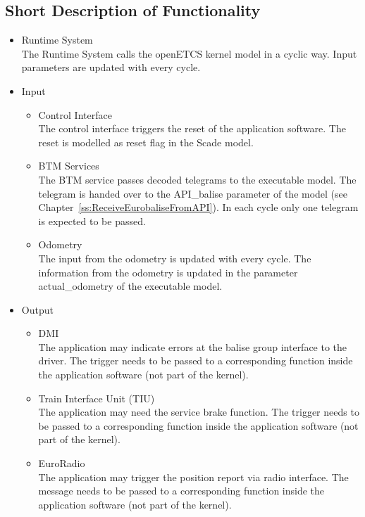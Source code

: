 \documentclass{template/openetcs_report}
\begin{document}
\subsection{Short Description of Functionality}

\begin{itemize}
\item Runtime System\\
The Runtime System calls the openETCS kernel model in a cyclic way. Input parameters are updated with every cycle.
\item Input
\begin{itemize}
\item Control Interface\\
The control interface triggers the reset of the application software. The reset is modelled as reset flag in the Scade model.

\item BTM Services\\
The BTM service passes decoded telegrams to the executable model. The telegram is handed over to the API\_balise parameter of the model (see Chapter~\ref{ss:ReceiveEurobaliseFromAPI}). In each cycle only one telegram is expected to be passed.

\item Odometry\\
The input from the odometry is updated with every cycle. The information from the odometry is updated in the parameter actual\_odometry of the executable model.
\end{itemize}

\item Output
\begin{itemize}
\item DMI\\
The application may indicate errors at the balise group interface to the driver. The trigger needs to be passed to a corresponding function inside the application software (not part of the kernel).
\item Train Interface Unit (TIU)\\
The application may need the service brake function. The trigger needs to be passed to a corresponding function inside the application software (not part of the kernel).
\item EuroRadio\\
The application may trigger the position report via radio interface. The message needs to be passed to a corresponding function inside the application software (not part of the kernel).
\end{itemize}

\end{itemize}
\end{document}
